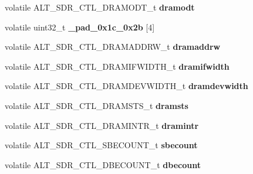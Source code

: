 \begin{DoxyCompactItemize}
volatile A\+L\+T\+\_\+\+S\+D\+R\+\_\+\+C\+T\+L\+\_\+\+D\+R\+A\+M\+O\+D\+T\+\_\+t {\bfseries dramodt}
\item 
\mbox{\label{structALT__SDR__CTL__s_aa2a949134c20ff36b2bebcae7a4a7445}} 
volatile uint32\+\_\+t {\bfseries \+\_\+pad\+\_\+0x1c\+\_\+0x2b} \mbox{[}4\mbox{]}
\item 
\mbox{\label{structALT__SDR__CTL__s_a61e5ffb44f1764881bf7e12402712b84}} 
volatile A\+L\+T\+\_\+\+S\+D\+R\+\_\+\+C\+T\+L\+\_\+\+D\+R\+A\+M\+A\+D\+D\+R\+W\+\_\+t {\bfseries dramaddrw}
\item 
\mbox{\label{structALT__SDR__CTL__s_ae12347d4712a82698e150b018deae14c}} 
volatile A\+L\+T\+\_\+\+S\+D\+R\+\_\+\+C\+T\+L\+\_\+\+D\+R\+A\+M\+I\+F\+W\+I\+D\+T\+H\+\_\+t {\bfseries dramifwidth}
\item 
\mbox{\label{structALT__SDR__CTL__s_a20a4255a0c271d0e719ab38d88f6d9d3}} 
volatile A\+L\+T\+\_\+\+S\+D\+R\+\_\+\+C\+T\+L\+\_\+\+D\+R\+A\+M\+D\+E\+V\+W\+I\+D\+T\+H\+\_\+t {\bfseries dramdevwidth}
\item 
\mbox{\label{structALT__SDR__CTL__s_a35fdc5e17dc03e81d29fdcde81781592}} 
volatile A\+L\+T\+\_\+\+S\+D\+R\+\_\+\+C\+T\+L\+\_\+\+D\+R\+A\+M\+S\+T\+S\+\_\+t {\bfseries dramsts}
\item 
\mbox{\label{structALT__SDR__CTL__s_a3ae68b81c42ae853eaa41c44437676f5}} 
volatile A\+L\+T\+\_\+\+S\+D\+R\+\_\+\+C\+T\+L\+\_\+\+D\+R\+A\+M\+I\+N\+T\+R\+\_\+t {\bfseries dramintr}
\item 
\mbox{\label{structALT__SDR__CTL__s_a9ee9beb96aa2d3f2a15d57d0b00e2f3e}} 
volatile A\+L\+T\+\_\+\+S\+D\+R\+\_\+\+C\+T\+L\+\_\+\+S\+B\+E\+C\+O\+U\+N\+T\+\_\+t {\bfseries sbecount}
\item 
\mbox{\label{structALT__SDR__CTL__s_a624788472b9e1b565e943f682f9b557a}} 
volatile A\+L\+T\+\_\+\+S\+D\+R\+\_\+\+C\+T\+L\+\_\+\+D\+B\+E\+C\+O\+U\+N\+T\+\_\+t {\bfseries dbecount}
\item 
\mbox{\label{structALT__SDR__CTL__s_a0a46945b776befffad9706b9b659e32f}} 

\end{DoxyCompactItemize}
